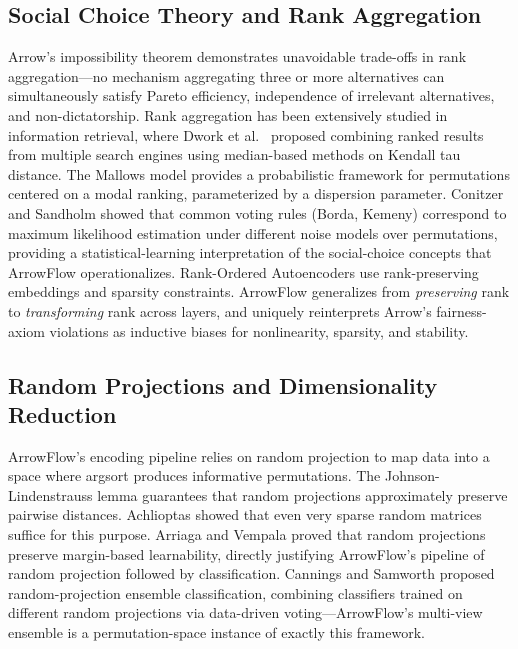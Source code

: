 \documentclass[12pt]{article}
\begin{document}
\subsection{Social Choice Theory and Rank Aggregation}
Arrow's impossibility theorem \citep{arrow1951social} demonstrates unavoidable trade-offs in rank aggregation---no mechanism aggregating three or more alternatives can simultaneously satisfy Pareto efficiency, independence of irrelevant alternatives, and non-dictatorship. Rank aggregation has been extensively studied in information retrieval, where Dwork et al.\ \citep{dwork2001rank} proposed combining ranked results from multiple search engines using median-based methods on Kendall tau distance. The Mallows model \citep{mallows1957nonnull} provides a probabilistic framework for permutations centered on a modal ranking, parameterized by a dispersion parameter. Conitzer and Sandholm \citep{conitzer2005voting} showed that common voting rules (Borda, Kemeny) correspond to maximum likelihood estimation under different noise models over permutations, providing a statistical-learning interpretation of the social-choice concepts that ArrowFlow operationalizes. Rank-Ordered Autoencoders \citep{bertens2016rank} use rank-preserving embeddings and sparsity constraints. ArrowFlow generalizes from \emph{preserving} rank to \emph{transforming} rank across layers, and uniquely reinterprets Arrow's fairness-axiom violations as inductive biases for nonlinearity, sparsity, and stability.

\subsection{Random Projections and Dimensionality Reduction}
ArrowFlow's encoding pipeline relies on random projection to map data into a space where argsort produces informative permutations. The Johnson-Lindenstrauss lemma \citep{johnson1984extensions} guarantees that random projections approximately preserve pairwise distances. Achlioptas \citep{achlioptas2003database} showed that even very sparse random matrices suffice for this purpose. Arriaga and Vempala \citep{arriaga2006algorithmic} proved that random projections preserve margin-based learnability, directly justifying ArrowFlow's pipeline of random projection followed by classification. Cannings and Samworth \citep{cannings2017random} proposed random-projection ensemble classification, combining classifiers trained on different random projections via data-driven voting---ArrowFlow's multi-view ensemble is a permutation-space instance of exactly this framework.
\end{document}
